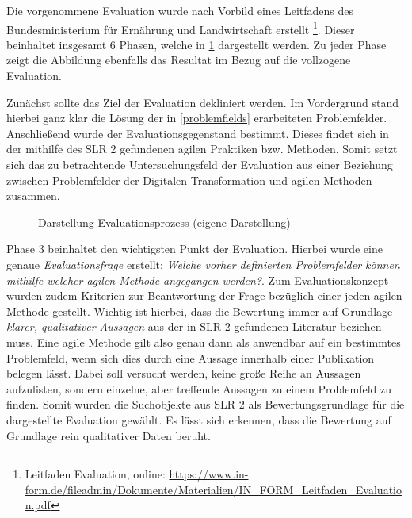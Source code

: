 Die vorgenommene Evaluation wurde nach Vorbild eines Leitfadens des Bundesministerium für Ernährung und Landwirtschaft erstellt \footnote{Leitfaden Evaluation, \newline online: \url{https://www.in-form.de/fileadmin/Dokumente/Materialien/IN_FORM_Leitfaden_Evaluation.pdf}}. Dieser beinhaltet insgesamt 6 Phasen, welche in \ref{fig:evaluation} dargestellt werden. Zu jeder Phase zeigt die Abbildung ebenfalls das Resultat im Bezug auf die  vollzogene Evaluation. 

Zunächst sollte das Ziel der Evaluation dekliniert werden. Im Vordergrund stand hierbei ganz klar die Lösung der in \ref{problemfields} erarbeiteten Problemfelder. Anschließend wurde der  Evaluationsgegenstand bestimmt. Dieses findet sich in der mithilfe des SLR 2 gefundenen agilen Praktiken bzw. Methoden. Somit setzt sich das zu betrachtende Untersuchungsfeld der Evaluation aus einer Beziehung zwischen Problemfelder der Digitalen Transformation und agilen Methoden zusammen.

\begin{figure}[H]
	\centering
	\caption[Darstellung Evaluationsprozess]{Darstellung Evaluationsprozess (eigene Darstellung)}
	\label{fig:evaluation}
\end{figure}

Phase 3 beinhaltet den wichtigsten Punkt der Evaluation. Hierbei wurde eine genaue \textit{Evaluationsfrage} erstellt: \textit{Welche vorher definierten Problemfelder können mithilfe welcher agilen Methode angegangen werden?}. Zum Evaluationskonzept wurden zudem Kriterien zur Beantwortung der Frage bezüglich einer jeden agilen Methode gestellt. Wichtig ist hierbei, dass die Bewertung immer auf Grundlage \textit{klarer, qualitativer Aussagen} aus der in SLR 2 gefundenen Literatur beziehen muss. Eine agile Methode gilt also genau dann als anwendbar auf ein bestimmtes Problemfeld, wenn sich dies durch eine Aussage innerhalb einer Publikation belegen lässt. Dabei soll versucht werden, keine große Reihe an Aussagen aufzulisten, sondern einzelne, aber treffende Aussagen zu einem Problemfeld zu finden. Somit wurden die Suchobjekte aus SLR 2 als Bewertungsgrundlage für die dargestellte Evaluation gewählt.  Es lässt sich erkennen, dass die Bewertung auf Grundlage rein qualitativer Daten beruht.

